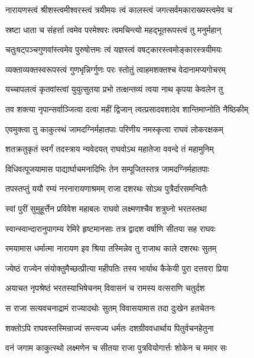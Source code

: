 \twolineshloka
{नारायणस्त्वं श्रीशस्त्वमीश्वरस्त्वं त्रयीमयः}
{त्वं कालस्त्वं जगत्सर्वमकाराख्यस्त्वमेव च}%

\twolineshloka
{स्रष्टा धाता च संहर्त्ता त्वमेव परमेश्वरः}
{त्वमचिन्त्यो महद्भूतरूपस्त्वं तु मनुर्महान्}%

\twolineshloka
{चतुःषट्पञ्चगुणवांस्त्वमेव पुरुषोत्तमः}
{त्वं यज्ञस्त्वं वषट्कारस्त्वमोङ्कारस्त्रयीमयः}%

\twolineshloka
{व्यक्ताव्यक्तस्वरूपस्त्वं गुणभृन्निर्ग्गुणः परः}
{स्तोतुं त्वाहमशक्तश्च वेदानामप्यगोचरम्}%

\twolineshloka
{यच्चापलत्वं कृतवांस्त्वां युयुत्सुतया प्रभो}
{तत्क्षन्तव्यं त्वया नाथ कृपया केवलेन तु}%

\twolineshloka
{तव शक्त्या नृपान्सर्वाञ्जित्वा दत्वा महीं द्विजान्}
{त्वत्प्रसादवशादेव शान्तिमाप्नोति नैष्ठिकीम्}%


\twolineshloka
{एवमुक्त्वा तु काकुत्स्थं जामदग्निर्महातपाः}
{परिणीय नमस्कृत्वा राघवं लोकरक्षकम्}%

\twolineshloka
{शतक्रतुकृतं स्वर्गं तदस्त्राय न्यवेदयत्}
{राघवोऽथ महातेजा ववन्दे तं महामुनिम्}%

\twolineshloka
{विधिवत्पूजयामास पाद्यार्घाचमनादिभिः}
{तेन सम्पूजितस्तत्र जामदग्निर्महातपाः}%

\twolineshloka
{तपस्तप्तुं ययौ रम्यं नरनारायणाश्रमम्}
{राजा दशरथः सोऽथ पुत्रैर्दारसमन्वितैः}%

\twolineshloka
{स्वां पुरीं सुमुहूर्त्तेन प्रविवेश महाबलः}
{राघवो लक्ष्मणश्चैव शत्रुघ्नो भरतस्तथा}%

\twolineshloka
{स्वान्स्वान्दारानुपागम्य रेमिरे हृष्टमानसाः}
{तत्र द्वादश वर्षाणि सीतया सह राघवः}%

\twolineshloka
{रमयामास धर्मात्मा नारायण इव श्रिया}
{तस्मिन्नेव तु राजाथ काले दशरथः सुतम्}%

\twolineshloka
{ज्येष्ठं राज्येन संयोक्तुमैच्छत्प्रीत्या महीपतिः}
{तस्य भार्याथ कैकेयी पुरा दत्तवरा प्रिया}%

\twolineshloka
{अयाचत नृपश्रेष्ठं भरतस्याभिषेचनम्}
{विवासनं च रामस्य वत्सराणि चतुर्दश}%

\twolineshloka
{स राजा सत्यवचनाद्रामं राज्यादथोः सुतम्}
{विवासयामास तदा दुःखेन हतचेतनः}%

\twolineshloka
{शक्तोऽपि राघवस्तस्मिन्राज्यं सन्त्यज्य धर्मतः}
{दशग्रीववधार्थाय पितुर्वचनहेतुना}%

\twolineshloka
{वनं जगाम काकुत्स्थो लक्ष्मणेन च सीतया}
{राजा पुत्रवियोगार्त्तः शोकेन च ममार सः}%

